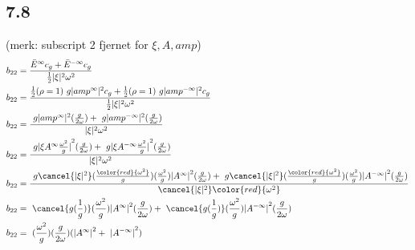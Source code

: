 \subsection{7.8}

(merk: subscript 2 fjernet for $\xi, A, amp$)
\begin{align}
	b_{22} &=  \frac{\bar{E}^{\infty} c_g + \bar{E}^{-\infty} c_g }{\frac{1}{2} |\xi|^2 \omega^2}\\
	b_{22} &=  \frac{\frac{1}{2}(\rho=1) g |amp^{\infty}|^2  c_g + \frac{1}{2}(\rho=1) g |amp^{-\infty}|^2 c_g }{\frac{1}{2} |\xi|^2 \omega^2}\\
	b_{22} &=  \frac{ g |amp^{\infty}|^2  (\frac{g}{2\omega}) +  g |amp^{-\infty}|^2 (\frac{g}{2\omega}) }{ |\xi|^2 \omega^2}\\
	b_{22} &=  \frac{ g {|\xi A^{\infty} \frac{\omega^2}{g}|}^2  (\frac{g}{2\omega}) +  g {|\xi A^{-\infty} \frac{\omega^2}{g}|}^2  (\frac{g}{2\omega}) }{ |\xi|^2 \omega^2}\\
b_{22} &=  \frac{  g \cancel{|\xi|^2} (\frac{\color{red}{\omega^2}}{g})(\frac{\omega^2}{g}) {| A^{\infty} |}^2  (\frac{g}{2\omega}) + g \cancel{|\xi|^2}  (\frac{\color{red}{\omega^2}}{g})(\frac{\omega^2}{g}) {| A^{-\infty}|}^2  (\frac{g}{2\omega}) }{ \cancel{|\xi|^2} \color{red}{\omega^2}}\\
b_{22} &=    \cancel{g  (\frac{1}{g})}(\frac{\omega^2}{g}) {| A^{\infty} |}^2  (\frac{g}{2\omega}) +  \cancel{g   (\frac{1}{g})}(\frac{\omega^2}{g}) {| A^{-\infty}|}^2  (\frac{g}{2\omega}) \\
b_{22} &=    (\frac{\omega^2}{g})   (\frac{g}{2\omega}) ({| A^{\infty} |}^2 +  {| A^{-\infty}|}^2)
\end{align}

